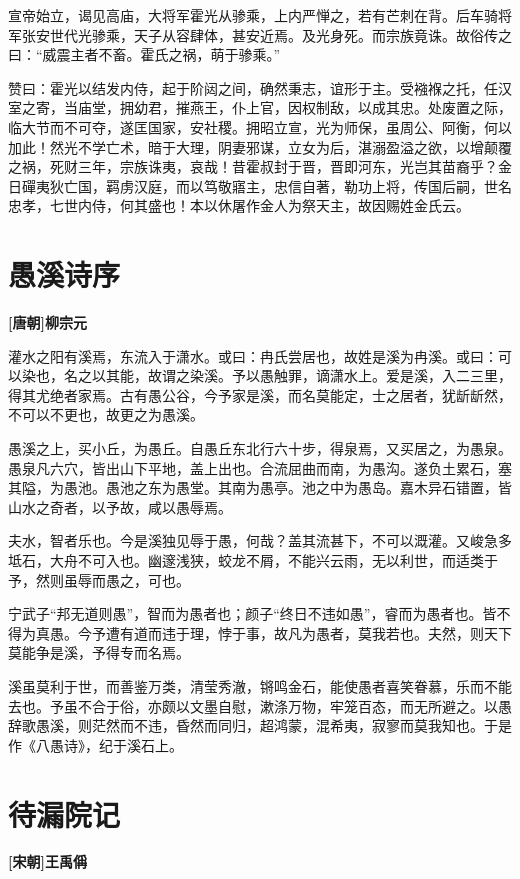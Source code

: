 \documentclass[UTF8,titlepage,oneside]{ctexbook}
\begin{document}
宣帝始立，谒见高庙，大将军霍光从骖乘，上内严惮之，若有芒刺在背。后车骑将军张安世代光骖乘，天子从容肆体，甚安近焉。及光身死。而宗族竟诛。故俗传之曰：“威震主者不畜。霍氏之祸，萌于骖乘。”


赞曰：霍光以结发内侍，起于阶闼之间，确然秉志，谊形于主。受襁褓之托，任汉室之寄，当庙堂，拥幼君，摧燕王，仆上官，因权制敌，以成其忠。处废置之际，临大节而不可夺，遂匡国家，安社稷。拥昭立宣，光为师保，虽周公、阿衡，何以加此！然光不学亡术，暗于大理，阴妻邪谋，立女为后，湛溺盈溢之欲，以增颠覆之祸，死财三年，宗族诛夷，哀哉！昔霍叔封于晋，晋即河东，光岂其苗裔乎？金日磾夷狄亡国，羁虏汉庭，而以笃敬寤主，忠信自著，勒功上将，传国后嗣，世名忠孝，七世内侍，何其盛也！本以休屠作金人为祭天主，故因赐姓金氏云。



\chapter*{愚溪诗序}
\begin{center}
	\textbf{[唐朝]柳宗元}
\end{center}

灌水之阳有溪焉，东流入于潇水。或曰：冉氏尝居也，故姓是溪为冉溪。或曰：可以染也，名之以其能，故谓之染溪。予以愚触罪，谪潇水上。爱是溪，入二三里，得其尤绝者家焉。古有愚公谷，今予家是溪，而名莫能定，士之居者，犹龂龂然，不可以不更也，故更之为愚溪。

愚溪之上，买小丘，为愚丘。自愚丘东北行六十步，得泉焉，又买居之，为愚泉。愚泉凡六穴，皆出山下平地，盖上出也。合流屈曲而南，为愚沟。遂负土累石，塞其隘，为愚池。愚池之东为愚堂。其南为愚亭。池之中为愚岛。嘉木异石错置，皆山水之奇者，以予故，咸以愚辱焉。

夫水，智者乐也。今是溪独见辱于愚，何哉？盖其流甚下，不可以溉灌。又峻急多坻石，大舟不可入也。幽邃浅狭，蛟龙不屑，不能兴云雨，无以利世，而适类于予，然则虽辱而愚之，可也。

宁武子“邦无道则愚”，智而为愚者也；颜子“终日不违如愚”，睿而为愚者也。皆不得为真愚。今予遭有道而违于理，悖于事，故凡为愚者，莫我若也。夫然，则天下莫能争是溪，予得专而名焉。

溪虽莫利于世，而善鉴万类，清莹秀澈，锵鸣金石，能使愚者喜笑眷慕，乐而不能去也。予虽不合于俗，亦颇以文墨自慰，漱涤万物，牢笼百态，而无所避之。以愚辞歌愚溪，则茫然而不违，昏然而同归，超鸿蒙，混希夷，寂寥而莫我知也。于是作《八愚诗》，纪于溪石上。


\chapter*{待漏院记}
\begin{center}
	\textbf{[宋朝]王禹偁}
\end{center}
\end{document}
